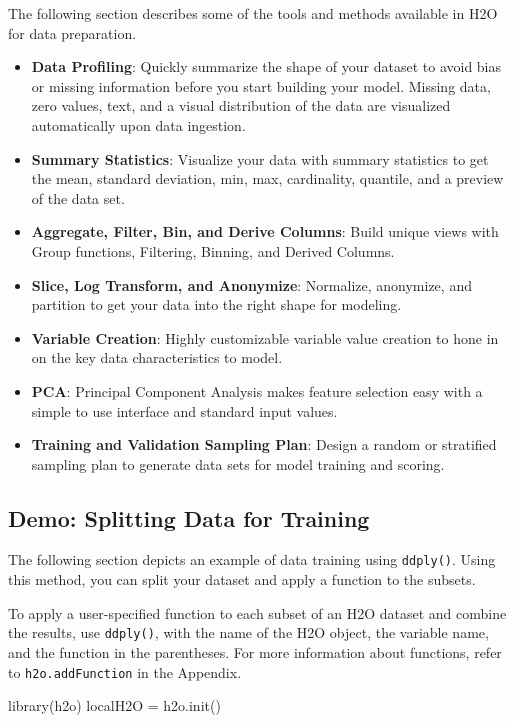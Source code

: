 \documentclass[11pt]{article}
\begin{document}
\begin{enumerate}
The following section describes some of the tools and methods available in H2O for data preparation. 
\begin{itemize}
\item \textbf{Data Profiling}: Quickly summarize the shape of your dataset to avoid bias or missing information before you start building your model. Missing data, zero values, text, and a visual distribution of the data are visualized automatically upon data ingestion. 
\item \textbf{Summary Statistics}: Visualize your data with summary statistics to get the mean, standard deviation, min, max, cardinality, quantile, and a preview of the data set. 
\item \textbf{Aggregate, Filter, Bin, and Derive Columns}: Build unique views with Group functions, Filtering, Binning, and Derived Columns. 
\item \textbf{Slice, Log Transform, and Anonymize}: Normalize, anonymize, and partition to get your data into the right shape for modeling. 
\item \textbf{Variable Creation}: Highly customizable variable value creation to hone in on the key data characteristics to model. 
\item \textbf{PCA}: Principal Component Analysis makes feature selection easy with a simple to use interface and standard input values. 
\item \textbf{Training and Validation Sampling Plan}: Design a random or stratified sampling plan to generate data sets for model training and scoring. 
\end{itemize}

\subsection{Demo: Splitting Data for Training}

The following section depicts an example of data training using {\texttt{ddply()}}. Using this method, you can split your dataset and apply a function to the subsets.

To apply a user-specified function to each subset of an H2O dataset and combine the results, use {\texttt{ddply()}}, with the name of the H2O object, the variable name, and the function in the parentheses. For more information about functions, refer to {\texttt{h2o.addFunction}} in the Appendix.

\begin{spverbatim}
library(h2o)
localH2O = h2o.init()


\end{spverbatim}
\end{enumerate}
\end{document}

